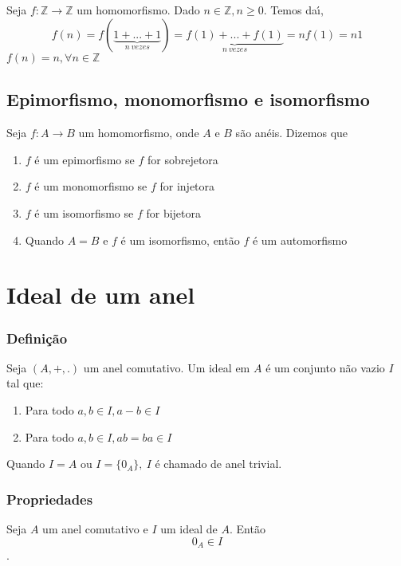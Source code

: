 Seja $f:\mathbb{Z}\rightarrow\mathbb{Z}$ um homomorfismo. Dado $n\in\mathbb{Z},n\geq 0$. Temos da{\'\i}, \[f(n)=f(\underbrace{1+...+1}_{n\ vezes})=\underbrace{f(1)+...+f(1)}_{n\ vezes}=nf(1)=n1\]
$f(n)=n,\forall n\in\mathbb{Z}$

\subsection{Epimorfismo, monomorfismo e isomorfismo}
\begin{definicao} Seja $f:A\rightarrow B$ um homomorfismo, onde $A$ e $B$ s{\~a}o an{\'e}is. Dizemos que
\begin{enumerate}
\item $f$ {\'e} um epimorfismo se $f$ for sobrejetora
\item $f$ {\'e} um monomorfismo se $f$ for injetora
\item $f$ {\'e} um isomorfismo se $f$ for bijetora
\item Quando $A=B$ e $f$ {\'e} um isomorfismo, ent{\~a}o $f$ {\'e} um automorfismo
\end{enumerate}
\end{definicao}

\section{Ideal de um anel}
\subsubsection{Defini{\c c}{\~a}o}
\begin{definicao} Seja $(A,+,.)$ um anel comutativo. Um ideal em $A$ {\'e} um conjunto n{\~a}o vazio $I$ tal que:
\begin{enumerate}
\item Para todo $a,b\in I,a-b\in I$
\item Para todo $a,b\in I, ab=ba\in I$
\end{enumerate}
\end{definicao}

Quando $I=A$ ou $I=\{0_{A}\},\ I$ {\'e} chamado de anel trivial.

\subsubsection{Propriedades}
\begin{proposicao} Seja $A$ um anel comutativo e $I$ um ideal de $A$. Ent{\~a}o \[0_{A}\in I\].\end{proposicao}

